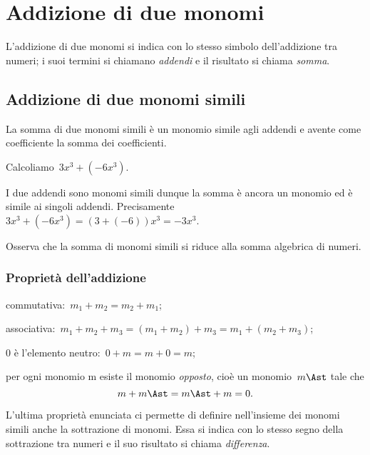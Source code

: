 \section{Addizione di due monomi}

L'addizione di due monomi si indica con lo stesso
simbolo dell'addizione tra numeri; i suoi termini si
chiamano \emph{addendi} e il risultato si chiama \emph{somma}.

\subsection{Addizione di due monomi simili}

La somma di due monomi simili è un monomio simile agli addendi e
avente come coefficiente la somma dei coefficienti.

\begin{exrig}
 \begin{esempio}
Calcoliamo~$3x^{3}+(-6x^{3})$.

I due addendi sono monomi simili dunque la somma è ancora un monomio
ed è simile ai singoli addendi. Precisamente
$3x^{3}+(-6x^{3})=(3+(-6))x^{3}=-3x^{3}$.

Osserva che la somma di monomi simili si riduce alla somma algebrica di numeri.
 \end{esempio}
\end{exrig}

\ovalbox{\risolvi \ref{ese:10.23}}

\subsubsection{Proprietà dell'addizione}

\begin{enumeratea}
 \item commutativa:~$m_{{1}}+m_{2}=m_{2}+m_{{1}}$;
 \item associativa:~$m_{{1}}+m_{2}+m_{3}=(m_{{1}}+m_{2})+m_{3}=m_{{1}}+(m_{2}+m_{3})$;
 \item 0 è l'elemento neutro:~$0+m=m+0=m$;
 \item per ogni monomio m esiste il monomio \emph{opposto}, cioè un
 monomio~$m\Ast$ tale che
 \[m + m\Ast = m\Ast +m=0.\]
\end{enumeratea}

L'ultima proprietà enunciata ci permette di definire
nell'insieme dei monomi simili anche la sottrazione di
monomi. Essa si indica con lo stesso segno della sottrazione tra numeri
e il suo risultato si chiama \emph{differenza}.

